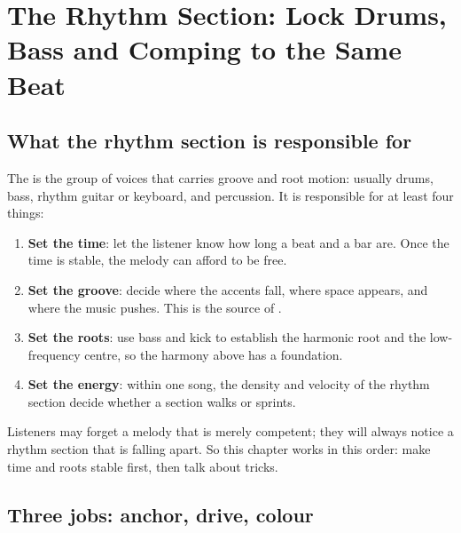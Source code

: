 \chapter{The Rhythm Section: Lock Drums, Bass and Comping to the Same Beat}
\label{ch:rhythm}


\section{What the rhythm section is responsible for}
\label{sec:rhythm-job}

The  is the group of voices that carries groove and root motion: usually drums, bass, rhythm guitar or keyboard, and percussion. It is responsible for at least four things:

\begin{enumerate}
\item \textbf{Set the time}: let the listener know how long a beat and a bar are. Once the time is stable, the melody can afford to be free.
\item \textbf{Set the groove}: decide where the accents fall, where space appears, and where the music pushes. This is the source of .
\item \textbf{Set the roots}: use bass and kick to establish the harmonic root and the low-frequency centre, so the harmony above has a foundation.
\item \textbf{Set the energy}: within one song, the density and velocity of the rhythm section decide whether a section walks or sprints.
\end{enumerate}

Listeners may forget a melody that is merely competent; they will always notice a rhythm section that is falling apart. So this chapter works in this order: make time and roots stable first, then talk about tricks.

\section{Three jobs: anchor, drive, colour}
\label{sec:rhythm-layers}

